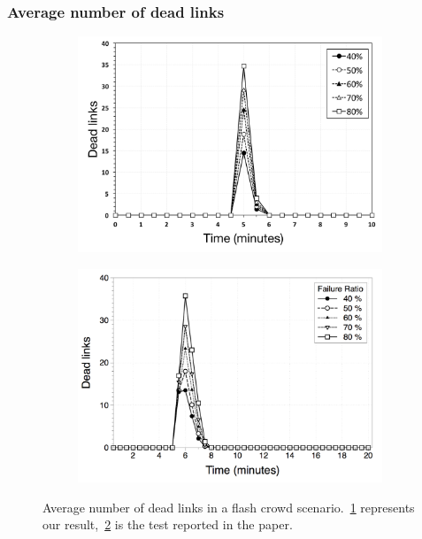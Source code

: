 \documentclass{beamer}
\begin{document}
\begin{frame}
\frametitle{Average number of dead links}
    
\begin{figure}
\centering
\begin{subfigure}{.5\textwidth}
  \centering
  \includegraphics[keepaspectratio=true, width=1\linewidth]{images/average_dead_links}
  \caption{}
  \label{fig:average_dead_links}
\end{subfigure}%
\begin{subfigure}{.5\textwidth}
  \centering
  \includegraphics[keepaspectratio=true, width=1\linewidth]{images/paper_average_dead_links}
  \caption{}
  \label{fig:paper_average_dead_links}
\end{subfigure}
\caption{Average number of dead links in a flash crowd scenario.~\ref{fig:average_dead_links} represents our result,~\ref{fig:paper_average_dead_links} is the test reported in the paper.}
\label{fig:robustness_dead_links_failures}
\end{figure}

\end{frame}
\end{document}
